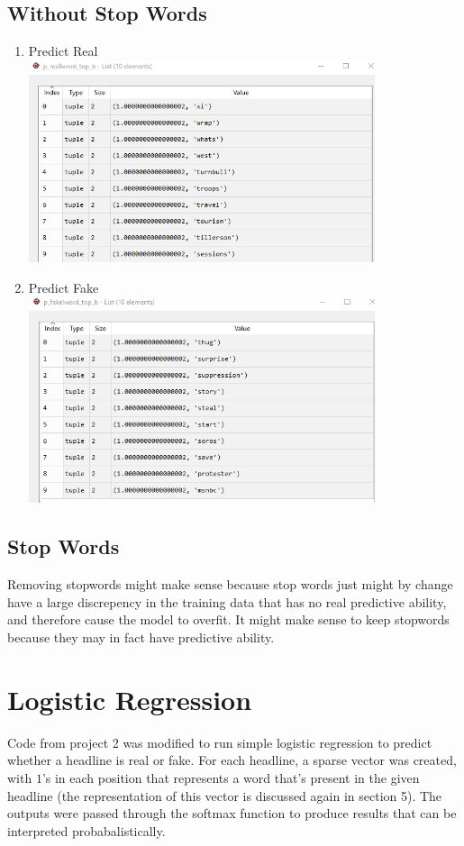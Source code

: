 \documentclass{article}
\begin{document}
   \subsection{Without Stop Words}
   \begin{enumerate}
      \item Predict Real
      \\
              \includegraphics[width=4in]{resources/part3/3breal}
      \item Predict Fake
      \\
              \includegraphics[width=4in]{resources/part3/3bfake}
   \end{enumerate}

   \subsection{Stop Words}
   Removing stopwords might make sense because stop words just might by change have a large discrepency in the
   training data that has no real predictive ability, and therefore cause the model to overfit. It might make
   sense to keep stopwords because they may in fact have predictive ability.


   \section{Logistic Regression}
   Code from project 2 was modified to run simple logistic regression to predict whether a headline is real
   or fake. For each headline, a sparse vector was created, with $1$'s in each position that represents a word
   that's present in the given headline (the representation of this vector is discussed again in section 5).
   The outputs were passed through the softmax function to produce results that can be interpreted probabalistically.
\end{document}
